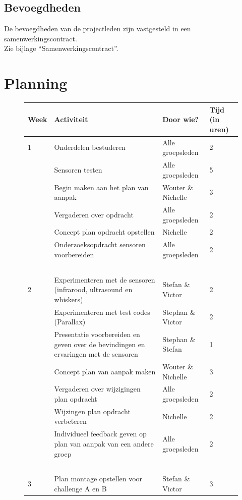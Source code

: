 \documentclass[oneside]{book}
\begin{document}
\section*{Bevoegdheden}
De bevoegdheden van de projectleden zijn vastgesteld in een samenwerkingscontract.\\
Zie bijlage “Samenwerkingscontract”.
\clearpage
\chapter{Planning}
\begin{figure}[H]\begin{adjustwidth}{-4.25cm}{}
\begin{tabular}{ | l | l | l | l | }
\hline
	Week & Activiteit & Door wie? & Tijd (in uren) \\ \hline
	1 & Onderdelen bestuderen & Alle groepsleden & 2 \\ \hline
	 & Sensoren testen & Alle groepsleden & 5 \\ \hline
	 & Begin maken aan het plan van aanpak & Wouter \& Nichelle & 3 \\ \hline
	 & Vergaderen over opdracht & Alle groepsleden & 2 \\ \hline
	 & Concept plan opdracht opstellen & Nichelle & 2 \\ \hline
	 & Onderzoeksopdracht sensoren voorbereiden & Alle groepsleden & 2 \\ \hline
	 & \  & \  & \  \\ \hline
	2 & Experimenteren met de sensoren (infrarood, ultrasound en whiskers) & Stefan \& Victor & 2 \\ \hline
	 & Experimenteren met test codes (Parallax) & Stephan \& Victor & 2 \\ \hline
	 & Presentatie voorbereiden en geven over de bevindingen en ervaringen met de sensoren & Stephan \& Stefan & 1 \\ \hline
	 & Concept plan van aanpak maken & Wouter \& Nichelle & 3 \\ \hline
	 & Vergaderen over wijzigingen plan opdracht & Alle groepsleden & 2 \\ \hline
	 & Wijzingen plan opdracht verbeteren & Nichelle & 2 \\ \hline
	 & Individueel feedback geven op plan van aanpak van een andere groep & Alle groepsleden & 2 \\ \hline
	 & \  & \  & \  \\ \hline
	3 & Plan montage opstellen voor challenge A en B & Stefan \& Victor & 3 \\ \hline

\end{tabular}
\end{adjustwidth}
\end{figure}
\end{document}
